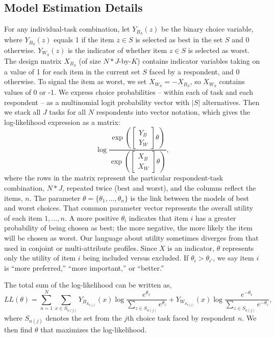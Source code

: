 \documentclass[nonblindrev]{informs3}
\newcommand{\numitems}{n}
\begin{document}
\begin{APPENDICES}
\subsection{Model Estimation Details}
For any individual-task combination, let $Y_{B_S}(z)$ be the binary choice variable, where $Y_{B_S}(z)$ equals 1 if the item $z \in S$ is selected as best in the set $S$ and 0 otherwise. $Y_{W_S}(z)$ is the indicator of whether item $z \in S$ is selected as worst. The design matrix $X_{B_S}$ (of size $N*J$-by-$K$) contains indicator variables taking on a value of 1 for each item in the current set $S$ faced by a respondent, and 0 otherwise. To signal the item as worst, we set $X_{W_S}=-X_{B_S}$, so $X_{W_S}$ contains values of 0 or -1. We express choice probabilities -- within each of task and each respondent -- as a multinomial logit probability vector with $|S|$ alternatives. Then we stack all $J$ tasks for all $N$ respondents into vector notation, which gives the log-likelihood expression as a matrix:
\[
\log \frac{
	\exp{\left(\begin{bmatrix}Y_B\\Y_W\end{bmatrix}\theta \right)} 
}
{ 
	\exp{\left(\begin{bmatrix}X_B\\X_W\end{bmatrix}\theta\right)}
},
\]
where the rows in the matrix represent the particular respondent-task combination, $N*J$, repeated twice (best and worst), and the columns reflect the items, $\numitems$. The parameter $\theta=\{\theta_1,\ldots,\theta_\numitems \}$ is the link between the models of best and worst choices. That common parameter vector represents the overall utility of each item $1,\ldots,\numitems$. A more positive $\theta_i$ indicates that item $i$ has a greater probability of being chosen as best; the more negative, the more likely the item will be chosen as worst. Our language about utility sometimes diverges from that used in conjoint or multi-attribute profiles. Since $X$ is an indicator, $\theta$ represents only the utility of item $i$ being included versus excluded. If $\theta_i > \theta_{i'}$, we say item $i$ is ``more preferred,'' ``more important,'' or ``better.'' 

The total sum of the log-likelihood can be written as,
\[
LL(\theta)=\sum_{n=1}^N \sum_{x \in S_{n(j)}} Y_{B_{S_{n(j)}}}(x)\log{\frac{e^{\theta_x}}{\sum_{z\in S_{n(j)}} e^{\theta_z}}}+ Y_{W_{S_{n(j)}}}(x)\log{\frac{e^{-\theta_x}}{\sum_{z\in S_{n(j)}} e^{-\theta_z}}},
\]
where $S_{n(j)}$ denotes the set from the $j$th choice task faced by respondent $n$. We then find $\theta$ that maximizes the log-likelihood. 


\end{APPENDICES}
\end{document}
